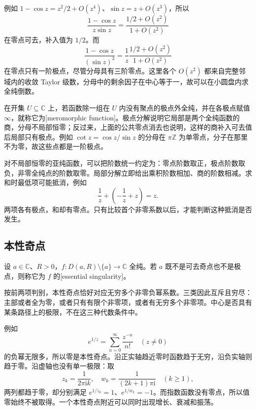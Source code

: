 \ProseParagraphBreak

例如 \(1-\cos z=z^2/2+O(z^4)\)、\(\sin z=z+O(z^3)\)，所以
\[
 \frac{1-\cos z}{z\sin z}
 =\frac{1/2+O(z^2)}{1+O(z^2)}
\]
在零点可去，补入值为 \(1/2\)。而
\[
 \frac{1-\cos z}{(\sin z)^3}
 =\frac1z\frac{1/2+O(z^2)}{1+O(z^2)}
\]
在零点只有一阶极点，尽管分母具有三阶零点。这里各个 \(O(z^2)\) 都来自完整邻域内的收敛 Taylor 级数，分母中的剩余因子在中心等于一，故可以在小圆盘内求全纯倒数。

\ProseParagraphBreak

在开集 \(U\subseteq\mathbb C\) 上，若函数除一组在 \(U\) 内没有聚点的极点外全纯，并在各极点赋值 \(\infty\)，就称它为[meromorphic function]。极点分解说明它局部是两个全纯函数的商，分母不局部恒零；反过来，上面的公共零点消去也说明，这样的商补入可去值后局部只有极点。例如 \(\cot z=\cos z/\sin z\) 的分母在 \(\pi\mathbb Z\) 为单零点，分子在那里不为零，故这些点都是一阶极点。

\ProseParagraphBreak

对不局部恒零的亚纯函数，可以把阶数统一约定为：零点阶数取正，极点阶数取负，非零全纯点的阶数取零。局部分解立即给出乘积阶数相加、商的阶数相减。求和时最低项可能抵消，例如
\[
 \frac1z+\left(-\frac1z+z\right)=z.
\]
两项各有极点，和却有零点。只有比较首个非零系数以后，才能判断这种抵消是否发生。

\subsection{本性奇点}
\label{b3:subsec:030203}

\begin{definition}\label{b3:def:03-essential}
设 \(a\in\mathbb C\)、\(R>0\)，\(f:D(a,R)\setminus\{a\}\to\mathbb C\) 全纯。若 \(a\) 既不是可去奇点也不是极点，则称它为 \(f\) 的[essential singularity]。
\end{definition}

按前两项判别，本性奇点恰好对应无穷多个非零负幂系数。三类因此互斥且穷尽：主部或者全为零，或者只有有限个非零项，或者有无穷多个非零项。中心是否具有某条路径上的极限，不在这三种代数条件中。

\ProseParagraphBreak

例如
\[
 e^{1/z}=\sum_{n=0}^{\infty}\frac{z^{-n}}{n!}
 \quad(z\ne0)
\]
的负幂无限多，所以零是本性奇点。沿正实轴趋近零时函数趋于无穷，沿负实轴则趋于零。沿虚轴也没有单一极限：取
\[
 z_k=\frac1{2\pi\mathrm{i}k},
 \quad w_k=\frac1{(2k+1)\pi\mathrm{i}}
 \quad(k\ge1),
\]
两列都趋于零，却分别满足 \(e^{1/z_k}=1\)、\(e^{1/w_k}=-1\)。而指数函数没有零点，所以值零始终不被取得。一个本性奇点附近可以同时出现增长、衰减和振荡。

